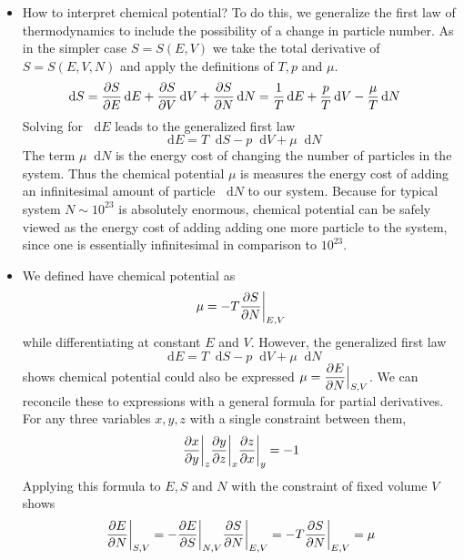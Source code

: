 \documentclass[11pt, a4paper]{article}
\newcommand{\diff}{\mathop{}\!\mathrm{d}} %
\begin{document}
\begin{itemize}
	\item How to interpret chemical potential? To do this, we generalize the first law of thermodynamics to include the possibility of a change in particle number. As in the simpler case $ S = S(E, V) $ we take the total derivative of $ S = S(E, V, N) $ and apply the definitions of $ T, p $ and $ \mu $.
	\begin{align*}
		\diff S &= \pdv{S}{E}\diff E + \pdv{S}{V}\diff V + \pdv{S}{N}\diff N = \frac{1}{T}\diff E + \frac{p}{T}\diff V - \frac{\mu}{T}\diff N
	\end{align*}
	Solving for $ \diff E $ leads to the generalized first law
	\begin{equation*}
		\diff E = T \diff S - p\diff V + \mu \diff N
	\end{equation*}
	The term $ \mu \diff N $ is the energy cost of changing the number of particles in the system. Thus the chemical potential $ \mu $ is measures the energy cost of adding an infinitesimal amount of particle $ \diff N $ to our system. Because for typical system $ N \sim 10^{23} $ is absolutely enormous, chemical potential can be safely viewed as the energy cost of adding adding one more particle to the system, since one is essentially infinitesimal in comparison to $ 10^{23} $.

	\item We defined have chemical potential as 
	\begin{equation*}
		\mu = -T \pdv{S}{N} \bigg|_{E, V}
	\end{equation*}
	while differentiating at constant $ E $ and $ V $. However, the generalized first law 
	\begin{equation*}
		\diff E = T \diff S - p\diff V + \mu \diff N
	\end{equation*}
	shows chemical potential could also be expressed $ \mu = \displaystyle{\pdv{E}{N}\Big|_{S, V}} $. We can reconcile these to expressions with a general formula for partial derivatives. For any three variables $ x, y, z $ with a single constraint between them,
	\begin{equation*}
		\pdv{x}{y} \bigg |_{z} \pdv{y}{z}\bigg |_{x} \pdv{z}{x}\bigg |_{y} = -1
	\end{equation*}
	Applying this formula to $ E, S $ and $ N $ with the constraint of fixed volume $ V $ shows
	\begin{equation*}
		\pdv{E}{N}\bigg |_{S, V} = - \pdv{E}{S}\bigg |_{N, V} \pdv{S}{N}\bigg |_{E, V} = - T \pdv{S}{N}\bigg |_{E, V} = \mu
	\end{equation*}
	

\end{itemize}
\end{document}
